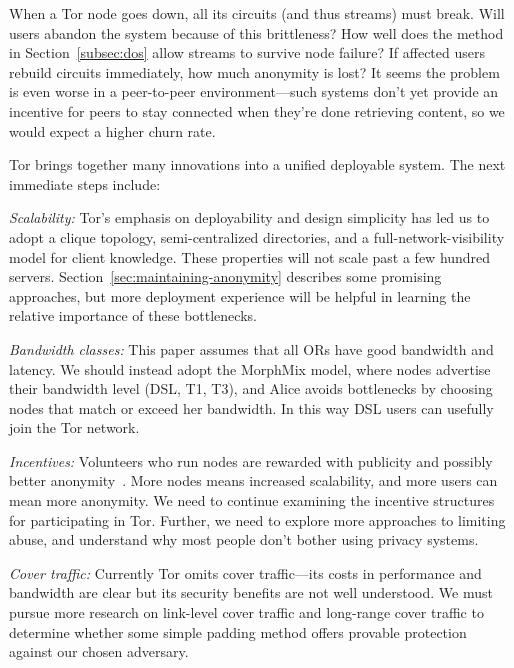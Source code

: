 \documentclass[times,10pt,twocolumn]{article}
\begin{document}

When a Tor node goes down, all its circuits (and thus streams) must break.
Will users abandon the system because of this brittleness? How well
does the method in Section~\ref{subsec:dos} allow streams to survive
node failure? If affected users rebuild circuits immediately, how much
anonymity is lost? It seems the problem is even worse in a peer-to-peer
environment---such systems don't yet provide an incentive for peers to
stay connected when they're done retrieving content, so we would expect
a higher churn rate.


\label{sec:conclusion}

Tor brings together many innovations into a unified deployable system. The
next immediate steps include:

\emph{Scalability:} Tor's emphasis on deployability and design simplicity
has led us to adopt a clique topology, semi-centralized
directories, and a full-network-visibility model for client
knowledge. These properties will not scale past a few hundred servers.
Section~\ref{sec:maintaining-anonymity} describes some promising
approaches, but more deployment experience will be helpful in learning
the relative importance of these bottlenecks.

\emph{Bandwidth classes:} This paper assumes that all ORs have
good bandwidth and latency. We should instead adopt the MorphMix model,
where nodes advertise their bandwidth level (DSL, T1, T3), and
Alice avoids bottlenecks by choosing nodes that match or
exceed her bandwidth. In this way DSL users can usefully join the Tor
network.

\emph{Incentives:} Volunteers who run nodes are rewarded with publicity
and possibly better anonymity~\cite{econymics}. More nodes means increased
scalability, and more users can mean more anonymity. We need to continue
examining the incentive structures for participating in Tor. Further,
we need to explore more approaches to limiting abuse, and understand
why most people don't bother using privacy systems.

\emph{Cover traffic:} Currently Tor omits cover traffic---its costs
in performance and bandwidth are clear but its security benefits are
not well understood. We must pursue more research on link-level cover
traffic and long-range cover traffic to determine whether some simple padding
method offers provable protection against our chosen adversary.
\end{document}
